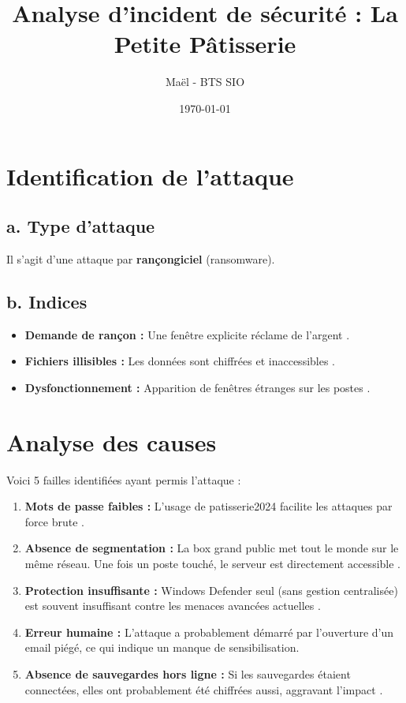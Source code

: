 \documentclass[a4paper,12pt]{article}
\title{\textbf{Analyse d'incident de sécurité : La Petite Pâtisserie}}
\author{Maël - BTS SIO}
\date{\today}
\begin{document}
\maketitle

\section{Identification de l'attaque}

\subsection*{a. Type d'attaque}
Il s'agit d'une attaque par \textbf{rançongiciel} (ransomware).

\subsection*{b. Indices}
\begin{itemize}
    \item \textbf{Demande de rançon :} Une fenêtre explicite réclame de l'argent .
    \item \textbf{Fichiers illisibles :} Les données sont chiffrées et inaccessibles .
    \item \textbf{Dysfonctionnement :} Apparition de fenêtres étranges sur les postes .
\end{itemize}

\section{Analyse des causes}
Voici 5 failles identifiées ayant permis l'attaque :

\begin{enumerate}
    \item \textbf{Mots de passe faibles :} L'usage de \og patisserie2024 \fg{} facilite les attaques par force brute .
    \item \textbf{Absence de segmentation :} La box grand public met tout le monde sur le même réseau. Une fois un poste touché, le serveur est directement accessible .
    \item \textbf{Protection insuffisante :} Windows Defender seul (sans gestion centralisée) est souvent insuffisant contre les menaces avancées actuelles .
    \item \textbf{Erreur humaine :} L'attaque a probablement démarré par l'ouverture d'un email piégé, ce qui indique un manque de sensibilisation.
    \item \textbf{Absence de sauvegardes hors ligne :} Si les sauvegardes étaient connectées, elles ont probablement été chiffrées aussi, aggravant l'impact .
\end{enumerate}
\end{document}
